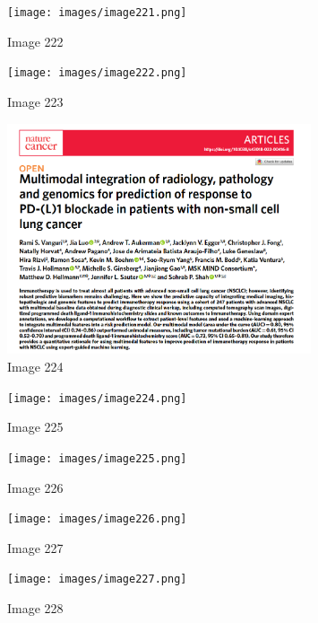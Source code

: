 \documentclass{article}%
\begin{document}
%


\begin{figure}[h!]%
\centering%
\texttt{[image: images/image221.png]}%
\caption{Image 222}%
\end{figure}

%


\begin{figure}[h!]%
\centering%
\texttt{[image: images/image222.png]}%
\caption{Image 223}%
\end{figure}

%


\begin{figure}[h!]%
\centering%
\includegraphics[width=0.8\textwidth]{images/image223.png}%
\caption{Image 224}%
\end{figure}

%


\begin{figure}[h!]%
\centering%
\texttt{[image: images/image224.png]}%
\caption{Image 225}%
\end{figure}

%


\begin{figure}[h!]%
\centering%
\texttt{[image: images/image225.png]}%
\caption{Image 226}%
\end{figure}

%


\begin{figure}[h!]%
\centering%
\texttt{[image: images/image226.png]}%
\caption{Image 227}%
\end{figure}

%


\begin{figure}[h!]%
\centering%
\texttt{[image: images/image227.png]}%
\caption{Image 228}%
\end{figure}
\end{document}
